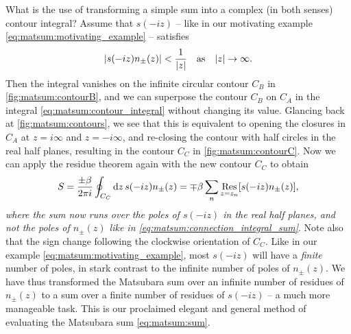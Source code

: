 What is the use of transforming a simple sum into a complex (in both senses) contour integral?
Assume that $s(-i z)$ -- like in our motivating example \eqref{eq:matsum:motivating_example} -- satisfies
\begin{equation}
	\lvert s(-iz) n_\pm(z) \rvert < \frac{1}{\lvert z \rvert} \quad \text{as} \quad \lvert z \rvert \rightarrow \infty .
\end{equation}
Then the integral vanishes on the infinite circular contour $C_B$ in \cref{fig:matsum:contourB},
and we can superpose  the contour $C_B$ on $C_A$ in the integral \eqref{eq:matsum:contour_integral} without changing its value.
Glancing back at \cref{fig:matsum:contours}, we see that this is equivalent to opening the closures  in $C_A$ at $z = i \infty$ and $z = -i \infty$, and re-closing the contour with half circles in the real half planes,  resulting in the contour $C_C$ in \cref{fig:matsum:contourC}.
Now we can apply the residue theorem again with the new contour $C_C$ to obtain
\begin{equation}
	S = \frac{\pm \beta}{2 \pi i} \oint_{C_C} \mathop{}\!\mathrm{d} z \, s(-iz) n_\pm(z) = \mp \beta \sum_n \operatorname*{Res}_{z=z_n} [s(-iz) n_\pm(z)] ,
\label{eq:matsum:sum_finite_residues}
\end{equation}
\emph{where the sum now runs over the poles of $s(-iz)$ in the real half planes, and not the poles of $n_\pm(z)$ like in \cref{eq:matsum:connection_integral_sum}}.
Note also that the sign change following the clockwise orientation of $C_C$.
Like in our example \eqref{eq:matsum:motivating_example}, most $s(-iz)$ will have a \emph{finite} number of poles, in stark contrast to the infinite number of poles of $n_\pm(z)$.
We have thus transformed the Matsubara sum over an infinite number of residues of $n_\pm(z)$ to a sum over a finite number of residues of $s(-iz)$ -- a much more manageable task.
This is our proclaimed elegant and general method of evaluating the Matsubara sum \eqref{eq:matsum:sum}.



